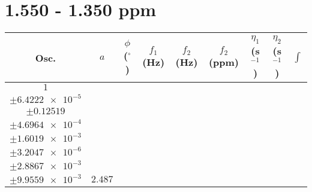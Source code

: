 \documentclass[8pt]{article}
\begin{document}
\section*{1.550 - 1.350 ppm}
\begin{longtable}[l]{c c c c c c c c c}
\toprule
Osc. & $a$ & $\phi$ ($^{\circ}$) & $f_1$ (Hz) & $f_2$ (Hz) & $f_2$ (ppm) & $\eta_1$ (s$^{-1}$) & $\eta_2$ (s$^{-1}$) & $\int$\\
\midrule
$\num{1}$ & \begin{tabular}[c]{@{}c@{}}$\num{2.9978e-2}$ \\ $\pm\num{6.4222e-5}$\end{tabular} & \begin{tabular}[c]{@{}c@{}}$\num{-0.1796}$ \\ $\pm\num{0.12519}$\end{tabular} & \begin{tabular}[c]{@{}c@{}}$\num{-9.3677}$ \\ $\pm\num{4.6964e-4}$\end{tabular} & \begin{tabular}[c]{@{}c@{}}$\num{721.37}$ \\ $\pm\num{1.6019e-3}$\end{tabular} & \begin{tabular}[c]{@{}c@{}}$\num{1.4431}$ \\ $\pm\num{3.2047e-6}$\end{tabular} & \begin{tabular}[c]{@{}c@{}}$\num{1.15}$ \\ $\pm\num{2.8867e-3}$\end{tabular} & \begin{tabular}[c]{@{}c@{}}$\num{4.2066}$ \\ $\pm\num{9.9559e-3}$\end{tabular} & $\num{2.487}$\\

\end{longtable}
\end{document}
